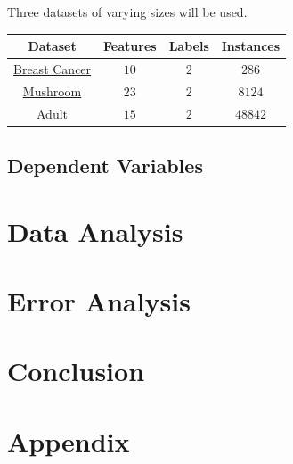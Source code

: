 \documentclass[12pt]{article}
\begin{document}
Three datasets of varying sizes will be used.

\begin{center}
    \begin{tabular}{|c|c|c|c|}
        \hline
        Dataset & Features & Labels & Instances \\
        \hline \hline
        \href{https://archive-beta.ics.uci.edu/ml/datasets/breast+cancer}{Breast Cancer} & $10$ & $2$ & $286$ \\
        \hline
        \href{https://archive-beta.ics.uci.edu/ml/datasets/mushroom}{Mushroom} & $23$ & $2$ & $8124$ \\
        \hline
        \href{https://archive-beta.ics.uci.edu/ml/datasets/adult}{Adult} & $15$ & $2$ & $48842$ \\
        \hline
    \end{tabular}
\end{center}

\subsection{Dependent Variables}

\section{Data Analysis}

\section{Error Analysis}

\section{Conclusion}

\section{Appendix}



\end{document}
